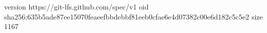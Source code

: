 version https://git-lfs.github.com/spec/v1
oid sha256:635b5ade87ee15070feaeefbbdebbf81eeb0cfae6e4d07382c00e6d182c5c5e2
size 1167
